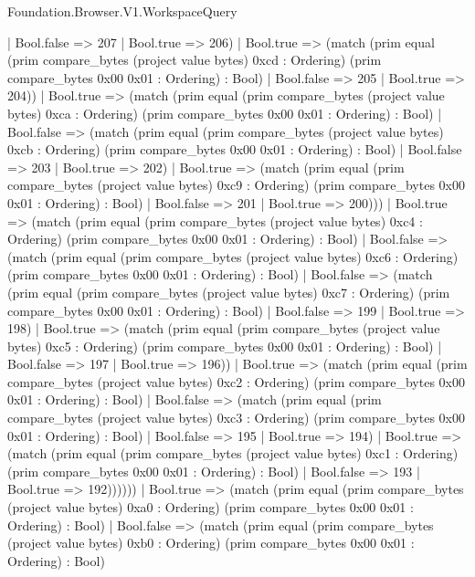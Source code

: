 \begin{lexlean}{Foundation.Browser.V1.WorkspaceQuery}
\begin{semanticmodule}
{                    | Bool.false => 207
                    | Bool.true => 206)
                  | Bool.true => (match (prim equal (prim compare_bytes (project value bytes) 0xcd : Ordering) (prim compare_bytes 0x00 0x01 : Ordering) : Bool)
                    | Bool.false => 205
                    | Bool.true => 204))
                | Bool.true => (match (prim equal (prim compare_bytes (project value bytes) 0xca : Ordering) (prim compare_bytes 0x00 0x01 : Ordering) : Bool)
                  | Bool.false => (match (prim equal (prim compare_bytes (project value bytes) 0xcb : Ordering) (prim compare_bytes 0x00 0x01 : Ordering) : Bool)
                    | Bool.false => 203
                    | Bool.true => 202)
                  | Bool.true => (match (prim equal (prim compare_bytes (project value bytes) 0xc9 : Ordering) (prim compare_bytes 0x00 0x01 : Ordering) : Bool)
                    | Bool.false => 201
                    | Bool.true => 200)))
              | Bool.true => (match (prim equal (prim compare_bytes (project value bytes) 0xc4 : Ordering) (prim compare_bytes 0x00 0x01 : Ordering) : Bool)
                | Bool.false => (match (prim equal (prim compare_bytes (project value bytes) 0xc6 : Ordering) (prim compare_bytes 0x00 0x01 : Ordering) : Bool)
                  | Bool.false => (match (prim equal (prim compare_bytes (project value bytes) 0xc7 : Ordering) (prim compare_bytes 0x00 0x01 : Ordering) : Bool)
                    | Bool.false => 199
                    | Bool.true => 198)
                  | Bool.true => (match (prim equal (prim compare_bytes (project value bytes) 0xc5 : Ordering) (prim compare_bytes 0x00 0x01 : Ordering) : Bool)
                    | Bool.false => 197
                    | Bool.true => 196))
                | Bool.true => (match (prim equal (prim compare_bytes (project value bytes) 0xc2 : Ordering) (prim compare_bytes 0x00 0x01 : Ordering) : Bool)
                  | Bool.false => (match (prim equal (prim compare_bytes (project value bytes) 0xc3 : Ordering) (prim compare_bytes 0x00 0x01 : Ordering) : Bool)
                    | Bool.false => 195
                    | Bool.true => 194)
                  | Bool.true => (match (prim equal (prim compare_bytes (project value bytes) 0xc1 : Ordering) (prim compare_bytes 0x00 0x01 : Ordering) : Bool)
                    | Bool.false => 193
                    | Bool.true => 192))))))
        | Bool.true => (match (prim equal (prim compare_bytes (project value bytes) 0xa0 : Ordering) (prim compare_bytes 0x00 0x01 : Ordering) : Bool)
          | Bool.false => (match (prim equal (prim compare_bytes (project value bytes) 0xb0 : Ordering) (prim compare_bytes 0x00 0x01 : Ordering) : Bool)
}
\end{semanticmodule}
\end{lexlean}
